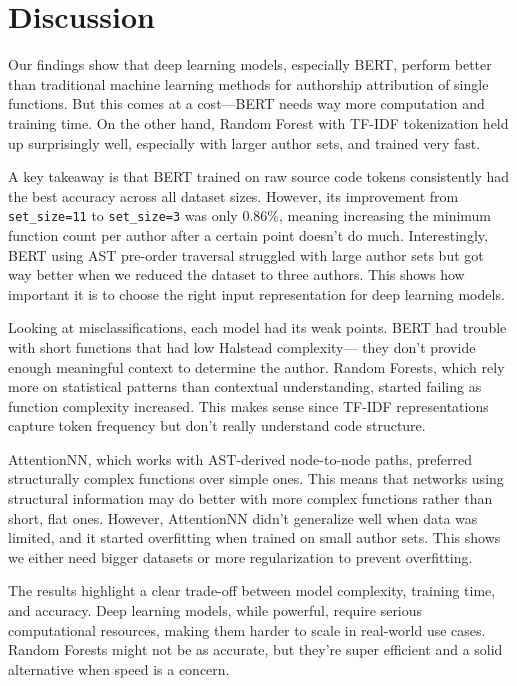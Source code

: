 \documentclass[conference]{IEEEtran}
\begin{document}
\section{Discussion}

Our findings show that deep learning models, especially BERT, perform better than traditional machine learning methods for authorship attribution 
of single functions. But this comes at a cost—BERT needs way more computation and training time. On the other hand, Random Forest with TF-IDF 
tokenization held up surprisingly well, especially with larger author sets, and trained very fast.

A key takeaway is that BERT trained on raw source code tokens consistently had the best accuracy across all dataset sizes. However, 
its improvement from \texttt{set\_size=11} to \texttt{set\_size=3} was only 0.86\%, meaning increasing the minimum function count per author 
after a certain point doesn’t do much. Interestingly, BERT using AST pre-order traversal struggled with large author sets but got way better 
when we reduced the dataset to three authors. This shows how important it is to choose the right input representation for deep learning models.

Looking at misclassifications, each model had its weak points. BERT had trouble with short functions that had low Halstead complexity— they 
don’t provide enough meaningful context to determine the author. Random Forests, which rely more on statistical patterns than contextual 
understanding, started failing as function complexity increased. This makes sense since TF-IDF representations capture token frequency but 
don’t really understand code structure.

AttentionNN, which works with AST-derived node-to-node paths, preferred structurally complex functions over simple ones. This means that 
networks using structural information may do better with more complex functions rather than short, flat ones. However, AttentionNN didn’t 
generalize well when data was limited, and it started overfitting when trained on small author sets. This shows we either need bigger 
datasets or more regularization to prevent overfitting.

The results highlight a clear trade-off between model complexity, training time, and accuracy. Deep learning models, while powerful, 
require serious computational resources, making them harder to scale in real-world use cases. Random Forests might not be as accurate, 
but they’re super efficient and a solid alternative when speed is a concern.
\end{document}
